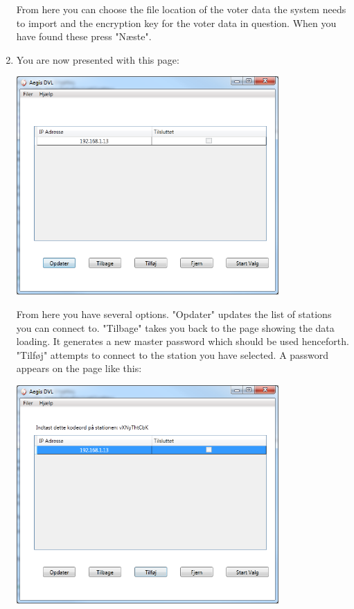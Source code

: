 \documentclass[a4paper]{report}
\begin{document}
\begin{enumerate}
\begin{center}
\end{center}
From here you can choose the file location of the voter data the system needs to import and the encryption key for the voter data in question. When you have found these press "N\ae ste".
\item You are now presented with this page: \\
\begin{center}
\includegraphics[width=100mm]{Overview.png}
\end{center}
From here you have several options. "Opdater" updates the list of stations you can connect to. "Tilbage" takes you back to the page showing the data loading. It generates a new master password which should be used henceforth. "Tilf\o j" attempts to connect to the station you have selected. A password appears on the page like this: \\
\begin{center}
\includegraphics[width=100mm]{OverviewWithPassword.png}
\end{center}

\end{enumerate}
\end{document}
